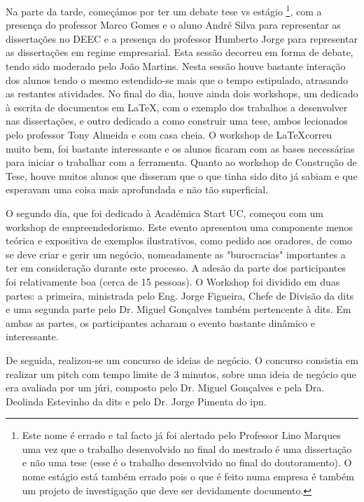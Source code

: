 Na parte da tarde, começámos por ter um debate tese vs estágio \footnote{Este nome é errado e tal facto já foi alertado pelo Professor Lino Marques uma vez que o trabalho desenvolvido no final do mestrado é uma dissertação e não uma tese (esse é o trabalho desenvolvido no final do doutoramento). O nome estágio está também errado pois o que é feito numa empresa é também um projeto de investigação que deve ser devidamente documento.}, com a presença do professor Marco Gomes e o aluno André Silva para representar as dissertações no DEEC e a presença do professor Humberto Jorge para representar as dissertações em regime empresarial. Esta sessão decorreu em forma de debate, tendo sido moderado pelo João Martins. Nesta sessão houve bastante interação dos alunos tendo o mesmo estendido-se mais que o tempo estipulado, atrasando as restantes atividades.
No final do dia, houve ainda dois workshops, um dedicado à escrita de documentos em \LaTeX, com o exemplo dos trabalhos a desenvolver nas dissertações, e outro dedicado a como construir uma tese, ambos lecionados pelo professor Tony Almeida e com casa cheia. O workshop de \LaTeX correu muito bem, foi bastante interessante e os alunos ficaram com as bases necessárias para iniciar o trabalhar com a ferramenta. Quanto ao workshop de Construção de Tese, houve muitos alunos que disseram que o que tinha sido dito já sabiam e que esperavam uma coisa mais aprofundada e não tão superficial.

O segundo dia, que foi dedicado à Académica Start UC, começou com um workshop de empreendedorismo. Este evento apresentou uma componente menos teórica e expositiva de exemplos ilustrativos, como pedido aos oradores, de como se deve criar e gerir um negócio, nomeadamente as "burocracias" importantes a ter em consideração durante este processo. A adesão da parte dos participantes foi relativamente boa (cerca de 15 pessoas). O Workshop foi dividido em duas partes: a primeira, ministrada pelo Eng. Jorge Figueira, Chefe de Divisão da \acrfull{dits} e uma segunda parte pelo Dr. Miguel Gonçalves também pertencente à \acrfull{dits}. Em ambas as partes, os participantes acharam o evento bastante dinâmico e interessante.

De seguida, realizou-se um concurso de ideias de negócio. O concurso consistia em realizar um pitch com tempo limite de 3 minutos, sobre uma ideia de negócio que era avaliada por um júri, composto pelo Dr. Miguel Gonçalves e pela Dra. Deolinda Estevinho da \acrfull{dits} e pelo Dr. Jorge Pimenta do \acrfull{ipn}.

